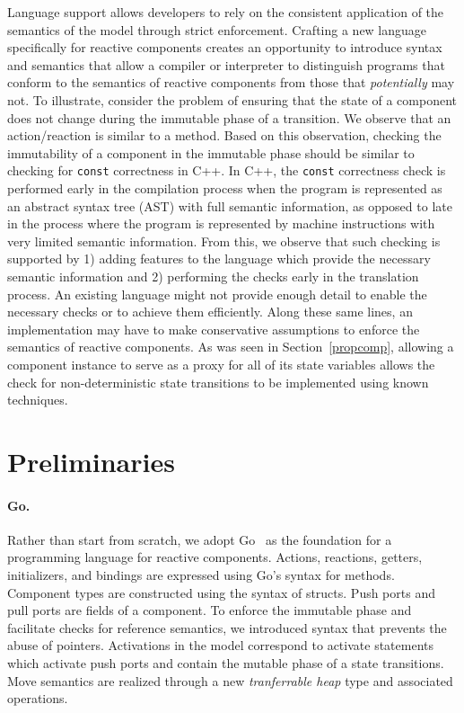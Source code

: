 Language support allows developers to rely on the consistent application of the semantics of the model through strict enforcement.
Crafting a new language specifically for reactive components creates an opportunity to introduce syntax and semantics that allow a compiler or interpreter to distinguish programs that conform to the semantics of reactive components from those that \emph{potentially} may not.
To illustrate, consider the problem of ensuring that the state of a component does not change during the immutable phase of a transition.
We observe that an action/reaction is similar to a method.
Based on this observation, checking the immutability of a component in the immutable phase should be similar to checking for \verb+const+ correctness in C++.
In C++, the \verb+const+ correctness check is performed early in the compilation process when the program is represented as an abstract syntax tree (AST) with full semantic information, as opposed to late in the process where the program is represented by machine instructions with very limited semantic information.
From this, we observe that such checking is supported by 1) adding features to the language which provide the necessary semantic information and 2) performing the checks early in the translation process.
An existing language might not provide enough detail to enable the necessary checks or to achieve them efficiently.
Along these same lines, an implementation may have to make conservative assumptions to enforce the semantics of reactive components.
As was seen in Section~\ref{propcomp}, allowing a component instance to serve as a proxy for all of its state variables allows the check for non-deterministic state transitions to be implemented using known techniques.

\section{Preliminaries}

\paragraph{Go.}
Rather than start from scratch, we adopt Go~\cite{go} as the foundation for a programming language for reactive components.
Actions, reactions, getters, initializers, and bindings are expressed using Go's syntax for methods.
Component types are constructed using the syntax of structs.
Push ports and pull ports are fields of a component.
To enforce the immutable phase and facilitate checks for reference semantics, we introduced syntax that prevents the abuse of pointers.
Activations in the model correspond to activate statements which activate push ports and contain the mutable phase of a state transitions.
Move semantics are realized through a new \emph{tranferrable heap} type and associated operations.

